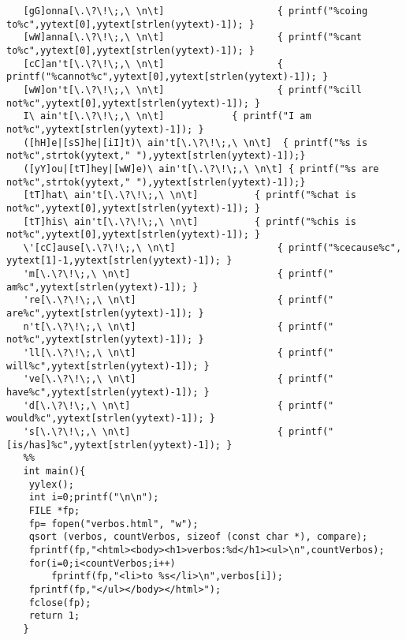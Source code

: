 \documentclass{report}
\begin{document}
\begin{verbatim}
   [gG]onna[\.\?\!\;,\ \n\t]                	{ printf("%coing to%c",yytext[0],yytext[strlen(yytext)-1]); }
   [wW]anna[\.\?\!\;,\ \n\t]                	{ printf("%cant to%c",yytext[0],yytext[strlen(yytext)-1]); }
   [cC]an't[\.\?\!\;,\ \n\t]                	{ printf("%cannot%c",yytext[0],yytext[strlen(yytext)-1]); }
   [wW]on't[\.\?\!\;,\ \n\t]                	{ printf("%cill not%c",yytext[0],yytext[strlen(yytext)-1]); }
   I\ ain't[\.\?\!\;,\ \n\t]          	{ printf("I am not%c",yytext[strlen(yytext)-1]); }
   ([hH]e|[sS]he|[iI]t)\ ain't[\.\?\!\;,\ \n\t]  { printf("%s is not%c",strtok(yytext," "),yytext[strlen(yytext)-1]);}
   ([yY]ou|[tT]hey|[wW]e)\ ain't[\.\?\!\;,\ \n\t] { printf("%s are not%c",strtok(yytext," "),yytext[strlen(yytext)-1]);}
   [tT]hat\ ain't[\.\?\!\;,\ \n\t]       	{ printf("%chat is not%c",yytext[0],yytext[strlen(yytext)-1]); }
   [tT]his\ ain't[\.\?\!\;,\ \n\t]       	{ printf("%chis is not%c",yytext[0],yytext[strlen(yytext)-1]); }
   \'[cC]ause[\.\?\!\;,\ \n\t]              	{ printf("%cecause%c", yytext[1]-1,yytext[strlen(yytext)-1]); }
   'm[\.\?\!\;,\ \n\t]                      	{ printf(" am%c",yytext[strlen(yytext)-1]); }
   're[\.\?\!\;,\ \n\t]                     	{ printf(" are%c",yytext[strlen(yytext)-1]); }
   n't[\.\?\!\;,\ \n\t]                     	{ printf(" not%c",yytext[strlen(yytext)-1]); }
   'll[\.\?\!\;,\ \n\t]                     	{ printf(" will%c",yytext[strlen(yytext)-1]); }
   've[\.\?\!\;,\ \n\t]                     	{ printf(" have%c",yytext[strlen(yytext)-1]); }
   'd[\.\?\!\;,\ \n\t]                      	{ printf(" would%c",yytext[strlen(yytext)-1]); }
   's[\.\?\!\;,\ \n\t]                      	{ printf(" [is/has]%c",yytext[strlen(yytext)-1]); }
   %%
   int main(){
   	yylex();
   	int i=0;printf("\n\n");
   	FILE *fp;
   	fp= fopen("verbos.html", "w");
   	qsort (verbos, countVerbos, sizeof (const char *), compare);
   	fprintf(fp,"<html><body><h1>verbos:%d</h1><ul>\n",countVerbos);
   	for(i=0;i<countVerbos;i++)
       	fprintf(fp,"<li>to %s</li>\n",verbos[i]);
   	fprintf(fp,"</ul></body></html>");
   	fclose(fp);
   	return 1;
   }
\end{verbatim}



\end{document}
